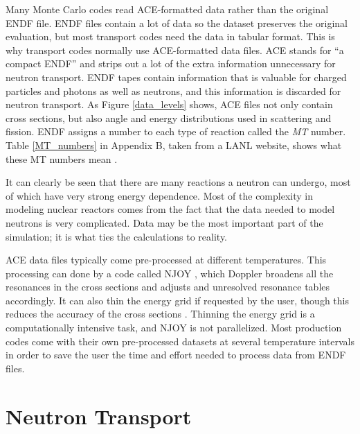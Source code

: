 Many Monte Carlo codes read ACE-formatted data rather than the original ENDF file.  ENDF files contain a lot of data so the dataset preserves the original evaluation, but most transport codes need the data in tabular format.  This is why transport codes normally use ACE-formatted data files. \cite{jaakko}  ACE stands for ``a compact ENDF'' and strips out a lot of the extra information unnecessary for neutron transport.  ENDF tapes contain information that is valuable for charged particles and photons as well as neutrons, and this information is discarded for neutron transport. As Figure \ref{data_levels} shows, ACE files not only contain cross sections, but also angle and energy distributions used in scattering and fission.  ENDF assigns a number to each type of reaction called the \emph{MT} number.  Table \ref{MT_numbers} in Appendix B, taken from a LANL website, shows what these MT numbers mean \cite{endfnums}.  

It can clearly be seen that there are many reactions a neutron can undergo, most of which have very strong energy dependence.  Most of the complexity in modeling nuclear reactors comes from the fact that the data needed to model neutrons is very complicated.  Data may be the most important part of the simulation; it is what ties the calculations to reality.  

ACE data files typically come pre-processed at different temperatures.  This processing can done by a code called NJOY \cite{jaakko}, which Doppler broadens all the resonances in the cross sections and adjusts and unresolved resonance tables accordingly.  It can also thin the energy grid if requested by the user, though this reduces the accuracy of the cross sections \cite{jaakko}.  Thinning the energy grid is a computationally intensive task, and NJOY is not parallelized.  Most production codes come with their own pre-processed datasets at several temperature intervals in order to save the user the time and effort needed to process data from ENDF files.


\section{Neutron Transport}

